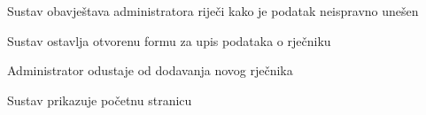 \begin{packed_item}
\begin{packed_item}
\begin{packed_enum}
								\item Sustav obavještava administratora riječi kako je podatak neispravno unešen
								\item Sustav ostavlja otvorenu formu za upis podataka o rječniku
								
							\end{packed_enum}
							
							\item[4.a] Administrator odustaje od dodavanja novog rječnika
							\item[] \begin{packed_enum}
								
								\item Sustav prikazuje početnu stranicu
								
							\end{packed_enum}
								\end{packed_item}
						\end{packed_item}
					
